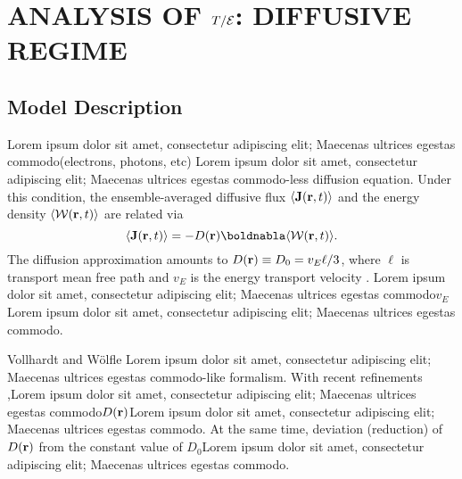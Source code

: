 \section{ANALYSIS OF \texorpdfstring{$T/{\cal E}$}{T/E}: DIFFUSIVE REGIME}
\label{sec:diffusion_section}

\subsection{Model Description}
\label{sec:diffusion_eq}

Lorem ipsum dolor sit amet, consectetur adipiscing elit; Maecenas ultrices egestas commodo(electrons, photons, etc) Lorem ipsum dolor sit amet, consectetur adipiscing elit; Maecenas ultrices egestas commodo-less diffusion equation. Under this condition, the ensemble-averaged diffusive flux $\langle{\bf J}({\bf r},t)\rangle$ and the energy density $\langle {\cal W}({\bf r},t)\rangle$ are related via\cite{1953_Morse}
\begin{equation}
\langle{\bf J}({\bf r},t)\rangle=-D({\bf r})\boldnabla\langle {\cal W}({\bf r},t)\rangle.
\label{eq:Jflux}
\end{equation}
The diffusion approximation amounts to $D({\bf r})\equiv D_0=v_E \ell/3$, where $\ell$ is transport mean free path and $v_E$ is the energy transport velocity \cite{1991_van_Albada_vE}. Lorem ipsum dolor sit amet, consectetur adipiscing elit; Maecenas ultrices egestas commodo$v_E$Lorem ipsum dolor sit amet, consectetur adipiscing elit; Maecenas ultrices egestas commodo. 

Vollhardt and W\"{o}lfle \cite{1980_Vollhardt_Wolfle}Lorem ipsum dolor sit amet, consectetur adipiscing elit; Maecenas ultrices egestas commodo-like formalism. With recent refinements \cite{2008_Cherroret,2010_Payne_PRL},Lorem ipsum dolor sit amet, consectetur adipiscing elit; Maecenas ultrices egestas commodo$D({\bf r})$Lorem ipsum dolor sit amet, consectetur adipiscing elit; Maecenas ultrices egestas commodo. At the same time, deviation (reduction) of $D({\bf r})$ from the constant value of $D_0$Lorem ipsum dolor sit amet, consectetur adipiscing elit; Maecenas ultrices egestas commodo.

